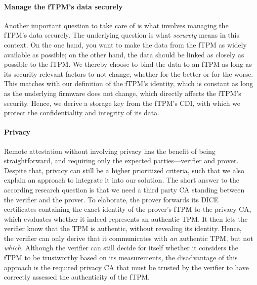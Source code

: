 \paragraph{Manage the fTPM's data securely}
Another important question to take care of is what involves managing the fTPM's data securely.
The underlying question is what \emph{securely} means in this context.
On the one hand, you want to make the data from the fTPM as widely available as possible; on the other hand, the data should be linked as closely as possible to the fTPM\@.
We thereby choose to bind the data to an fTPM as long as its security relevant factors to not change, whether for the better or for the worse.
This matches with our definition of the fTPM's identity, which is constant as long as the underlying firmware does not change, which directly affects the fTPM's security.
Hence, we derive a storage key from the fTPM's \ac{CDI}, with which we protect the confidentiality and integrity of its data.

\paragraph{Privacy}

Remote attestation without involving privacy has the benefit of being straightforward, and requiring only the expected parties---verifier and prover.
Despite that, privacy can still be a higher prioritized criteria, such that we also explain an approach to integrate it into our solution.
The short answer to the according research question is that we need a third party \ac{CA} standing between the verifier and the prover.
To elaborate, the prover forwards its \ac{DICE} certificates containing the exact identity of the prover's \ac{fTPM} to the privacy \ac{CA}, which evaluates whether it indeed represents an authentic TPM\@.
It then lets the verifier know that the TPM is authentic, without revealing its identity.
Hence, the verifier can only derive that it communicates with \emph{an} authentic TPM, but not \emph{which}.
Although the verifier can still decide for itself whether it considers the \ac{fTPM} to be trustworthy based on its measurements, the disadvantage of this approach is the required privacy \ac{CA} that must be trusted by the verifier to have correctly assessed the authenticity of the \ac{fTPM}.




